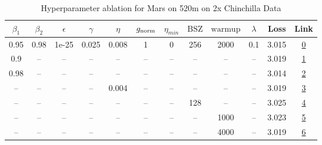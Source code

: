 \begin{table}[H]
\centering
\caption{Hyperparameter ablation for Mars on 520m on 2x Chinchilla Data}
\label{tab:ablation_mars_520m_on_2x_chinchilla_data}
\begin{tabular}{cccccccccccc}
\toprule
$\beta_1$ & $\beta_2$ & $\epsilon$ & $\gamma$ & $\eta$ & $g_{\mathrm{norm}}$ & $\eta_{min}$ & $\mathrm{BSZ}$ & $\mathrm{warmup}$ & $\lambda$ & Loss & Link \\
\midrule
0.95 & 0.98 & 1e-25 & 0.025 & 0.008 & 1 & 0 & 256 & 2000 & 0.1 & 3.015 & \href{https://wandb.ai/marin-community/optimizer-scaling/runs/sweep-520m-21B-mars1ddcddlr0.008-wd0.1-minlr0-warmup2000-b10.95--e9c503}{0} \\
\midrule
0.9 & -- & -- & -- & -- & -- & -- & -- & -- & -- & 3.019 & \href{https://wandb.ai/marin-community/optimizer-scaling/runs/sweep-520m-21B-mars95d994lr0.008-wd0.1-minlr0-warmup2000-b10.9-b-82302a}{1} \\
0.98 & -- & -- & -- & -- & -- & -- & -- & -- & -- & 3.014 & \href{https://wandb.ai/marin-community/optimizer-scaling/runs/sweep-520m-21B-mars1125cblr0.008-wd0.1-minlr0-warmup2000-b10.98--1a971c}{2} \\
-- & -- & -- & -- & 0.004 & -- & -- & -- & -- & -- & 3.019 & \href{https://wandb.ai/marin-community/optimizer-scaling/runs/sweep-520m-21B-mars79301dlr0.004-wd0.1-minlr0-warmup2000-b10.95--3c45f1}{3} \\
-- & -- & -- & -- & -- & -- & -- & 128 & -- & -- & 3.025 & \href{https://wandb.ai/marin-community/optimizer-scaling/runs/sweep-520m-21B-mars50507flr0.008-wd0.1-minlr0-warmup2000-b10.95--4cefa8}{4} \\
-- & -- & -- & -- & -- & -- & -- & -- & 1000 & -- & 3.023 & \href{https://wandb.ai/marin-community/optimizer-scaling/runs/sweep-520m-21B-marse5a362lr0.008-wd0.1-minlr0-warmup1000-b10.95--03de08}{5} \\
-- & -- & -- & -- & -- & -- & -- & -- & 4000 & -- & 3.019 & \href{https://wandb.ai/marin-community/optimizer-scaling/runs/sweep-520m-21B-mars6baa9blr0.008-wd0.1-minlr0-warmup4000-b10.95--dcbf07}{6} \\
\bottomrule
\end{tabular}
\end{table}

